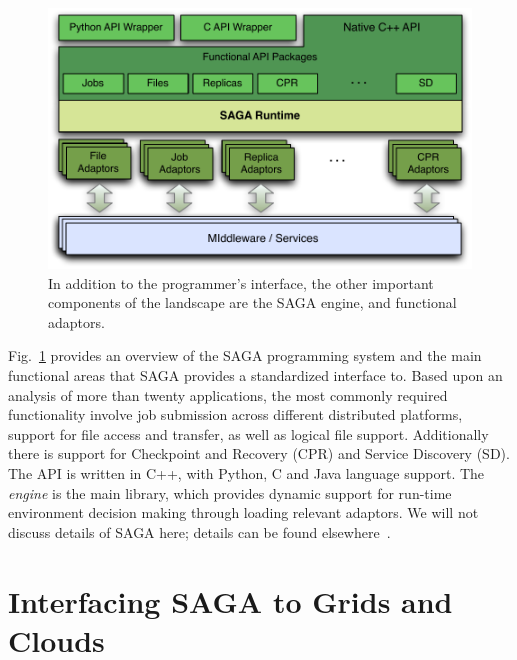 \documentclass[conference,final]{IEEEtran}
\newcommand{\upup}{\vspace*{-0.6em}}
\begin{document}
\begin{figure}[t]
\vspace{-2em}
\includegraphics[scale=0.5]{saga-figure02.pdf}
\caption{In addition to the programmer's interface,
  the other important components of the landscape are the SAGA engine,
  and functional adaptors.} \vspace{-3em}
\label{saga_figure}
\end{figure}

Fig.~\ref{saga_figure} provides an overview of the SAGA programming
system and the main functional areas that SAGA provides a standardized
interface to. Based upon an analysis of more than twenty applications,
the most commonly required functionality involve job submission across
different distributed platforms, support for file access and transfer,
as well as logical file support.  Additionally there is support for
Checkpoint and Recovery (CPR) and Service Discovery (SD).  The API is
written in C++, with Python, C and Java language support. The {\it
  engine} is the main library, which provides dynamic support for
run-time environment decision making through loading relevant
adaptors. We will not discuss details of SAGA here; details can be
found elsewhere~\cite{saga_url}.

\upup
\section{Interfacing SAGA to Grids and Clouds}
\end{document}

